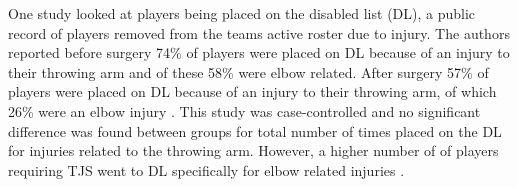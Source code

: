 One study looked at players being placed on the disabled list (DL), a public record of players removed from the teams active roster due to injury. The authors reported before surgery 74\% of players were placed on DL because of an injury to their throwing arm and of these 58\% were elbow related. After surgery 57\% of players were placed on DL because of an injury to their throwing arm, of which 26\% were an elbow injury \cite{Makhni2014}. This study was case-controlled and no significant difference was found between groups for total number of times placed on the DL for injuries related to the throwing arm. However, a higher number of of players requiring TJS went to DL specifically for elbow related injuries \cite{Makhni2014}.